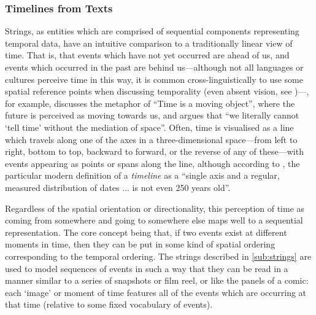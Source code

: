 \documentclass[a4paper,12pt,leqno]{article}
\newcommand{\nb}[1]{{\color{red}[NB\footnote{{\color{red}#1}}]}}
\begin{document}
\subsubsection{Timelines from Texts}\label{ssub:timelines}
Strings, as entities which are comprised of sequential components representing temporal data, have an intuitive comparison to a traditionally linear view of time. That is, that events which have not yet occurred are ahead of us, and events which occurred in the past are behind us---although not all languages or cultures perceive time in this way, it is common cross-linguistically to use some spatial reference points when discussing temporality
(even absent vision, see \citet{bottini2015space})---\citet[pp. 42--43]{lakoff2008metaphors}, for example, discusses the metaphor of ``Time is a moving object'', where the future is perceived as moving towards us, and \citet[p. 542]{mitchell1980spatial} argues that ``we literally cannot `tell time' without the mediation of space''. Often, time is visualised as a line which travels along one of the axes in a three-dimensional space---from left to right, bottom to top, backward to forward, or the reverse of any of these---with events appearing as points or spans along the line, although according to \citet[p. 14]{rosenberg2013cartographies}, the particular modern definition of a \textit{timeline} as a ``single axis and a regular, measured distribution of dates ... is not even 250 years old''.

Regardless of the spatial orientation or directionality, this perception of time as coming from somewhere and going to somewhere else maps well to a sequential representation. The core concept being that, if two events exist at different moments in time, then they can be put in some kind of spatial ordering corresponding to the temporal ordering. The strings described in \cref{sub:strings} are used to model sequences of events in such a way that they can be read in a manner similar to a series of snapshots or film reel, or like the panels of a comic: each `image' or moment of time features all of the events which are occurring at that time (relative to some fixed vocabulary of events).
\end{document}
